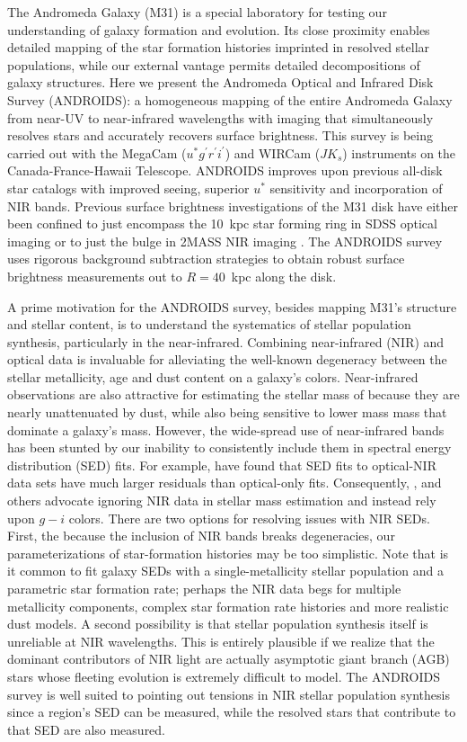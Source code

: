 \documentclass[11pt,twoside]{article}
\begin{document}
The Andromeda Galaxy (M31) is a special laboratory for testing our understanding of galaxy formation and evolution.
Its close proximity enables detailed mapping of the star formation histories imprinted in resolved stellar populations, while our external vantage permits detailed decompositions of galaxy structures.
Here we present the Andromeda Optical and Infrared Disk Survey (ANDROIDS): a homogeneous mapping of the entire Andromeda Galaxy from near-UV to near-infrared wavelengths with imaging that simultaneously resolves stars and accurately recovers surface brightness.
This survey is being carried out with the MegaCam ($u^*g^\prime r^\prime i^\prime$) and WIRCam ($JK_s$) instruments on the Canada-France-Hawaii Telescope.
ANDROIDS improves upon previous all-disk star catalogs \citep[e.g., the Local Group Galaxy Survey][]{Massey:2006} with improved seeing, superior $u^*$ sensitivity and incorporation of NIR bands.
Previous surface brightness investigations of the M31 disk have either been confined to just encompass the 10~kpc star forming ring in SDSS optical imaging \citep{Tempel:2010} or to just the bulge in 2MASS NIR imaging \cite{Beaton:2007}.
The ANDROIDS survey uses rigorous background subtraction strategies to obtain robust surface brightness measurements out to $R=40$~kpc along the disk.

A prime motivation for the ANDROIDS survey, besides mapping M31's structure and stellar content, is to understand the systematics of stellar population synthesis, particularly in the near-infrared.
Combining near-infrared (NIR) and optical data is invaluable for alleviating the well-known degeneracy between the stellar metallicity, age and dust content on a galaxy's colors.
Near-infrared observations are also attractive for estimating the stellar mass of because they are nearly unattenuated by dust, while also being sensitive to lower mass mass that dominate a galaxy's mass.
However, the wide-spread use of near-infrared bands has been stunted by our inability to consistently include them in spectral energy distribution (SED) fits.
For example, \cite{Taylor:2011} have found that SED fits to optical-NIR data sets have much larger residuals than optical-only fits.
Consequently, \cite{Zibetti:2009}, \cite{Taylor:2011} and others advocate ignoring NIR data in stellar mass estimation and instead rely upon $g-i$ colors.
There are two options for resolving issues with NIR SEDs.
First, the because the inclusion of NIR bands breaks degeneracies, our parameterizations of star-formation histories may be too simplistic.
Note that is it common to fit galaxy SEDs with a single-metallicity stellar population and a parametric star formation rate; perhaps the NIR data begs for multiple metallicity components, complex star formation rate histories and more realistic dust models.
A second possibility is that stellar population synthesis itself is unreliable at NIR wavelengths.
This is entirely plausible if we realize that the dominant contributors of NIR light are actually asymptotic giant branch (AGB) stars whose fleeting evolution is extremely difficult to model.
The ANDROIDS survey is well suited to pointing out tensions in NIR stellar population synthesis since a region's SED can be measured, while the resolved stars that contribute to that SED are also measured.
\end{document}

